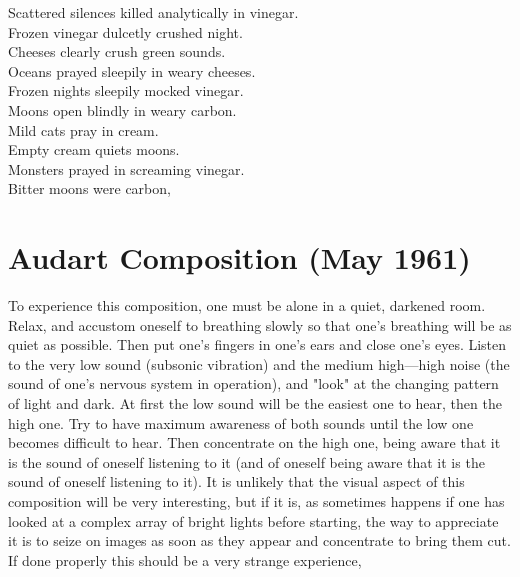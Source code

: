 Scattered silences killed analytically in vinegar.\\
Frozen vinegar dulcetly crushed night. \\
Cheeses clearly crush green sounds. \\
Oceans prayed sleepily in weary cheeses.\\
Frozen nights sleepily mocked vinegar.\\
Moons open blindly in weary carbon.\\
Mild cats pray in cream.\\
Empty cream quiets moons.\\
Monsters prayed in screaming vinegar.\\
Bitter moons were carbon,\\

\section{Audart Composition (May 1961)}

To experience this composition, one must be alone in a
quiet, darkened room. Relax, and accustom oneself to breathing
slowly so that one's breathing will be as quiet as possible.
Then put one's fingers in one's ears and close one's eyes.
Listen to the very low sound (subsonic vibration) and the medium
high---high noise (the sound of one's nervous system in operation),
and "look" at the changing pattern of light and dark.
At first the low sound will be the easiest one to hear, then
the high one. Try to have maximum awareness of both sounds
until the low one becomes difficult to hear. Then concentrate
on the high one, being aware that it is the sound of oneself
listening to it (and of oneself being aware that it is the 
sound of oneself listening to it). It is unlikely that the
visual aspect of this composition will be very interesting,
but if it is, as sometimes happens if one has looked at a complex
array of bright lights before starting, the way to appreciate 
it is to seize on images as soon as they appear and concentrate
to bring them cut. If done properly this should be a very strange experience, 

